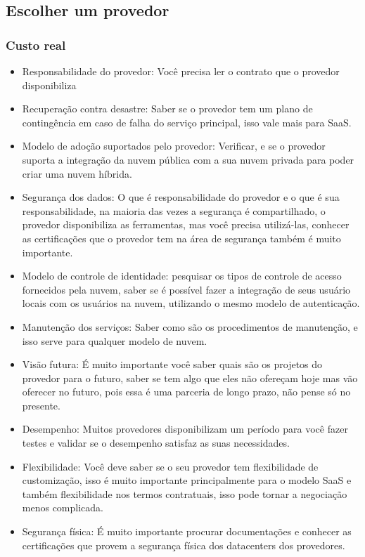\subsection{Escolher um provedor}

\begin{frame}
	\frametitle{Custo real}
	\begin{tiny}
	\begin{itemize}
		\item Responsabilidade do provedor: Você precisa ler o contrato que o provedor disponibiliza
		\item Recuperação contra desastre: Saber se o provedor tem um plano de contingência em caso de falha do serviço principal, isso vale mais para SaaS.
		\item Modelo de adoção suportados pelo provedor: Verificar, e se o provedor suporta a integração da nuvem pública com a sua nuvem privada para poder criar uma nuvem híbrida.
		\item Segurança dos dados: O que é responsabilidade do provedor e o que é sua responsabilidade, na maioria das vezes a segurança é compartilhado, o provedor disponibiliza as ferramentas, mas você precisa utilizá-las, conhecer as certificações que o provedor tem na área de segurança também é muito importante.
		\item Modelo de controle de identidade: pesquisar os tipos de controle de acesso fornecidos pela nuvem, saber se é possível fazer a integração de seus usuário locais com os usuários na nuvem, utilizando o mesmo modelo de autenticação.
		\item Manutenção dos serviços: Saber como são os procedimentos de manutenção, e isso serve para qualquer modelo de nuvem.
		\item Visão futura: É muito importante você saber quais são os projetos do provedor para o futuro, saber se tem algo que eles não ofereçam hoje mas vão oferecer no futuro, pois essa é uma parceria de longo prazo, não pense só no presente.
		\item Desempenho: Muitos provedores disponibilizam um período para você fazer testes e validar se o desempenho satisfaz as suas necessidades.
		\item Flexibilidade: Você deve saber se o seu provedor tem flexibilidade de customização, isso é muito importante principalmente para o modelo SaaS e também flexibilidade nos termos contratuais, isso pode tornar a negociação menos complicada.
		\item Segurança física: É muito importante procurar documentações e conhecer as certificações que provem a segurança física dos datacenters dos provedores.
	\end{itemize}
	\end{tiny}
\end{frame}

